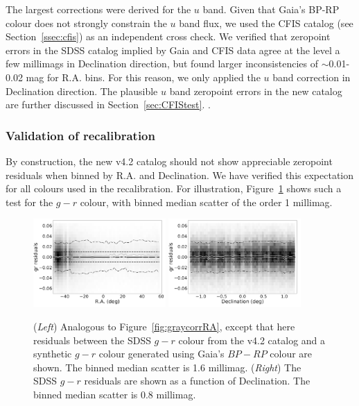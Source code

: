 \documentclass[fleqn,usenatbib]{mnras}
\begin{document}
The largest corrections were derived for the $u$ band. Given that Gaia's BP-RP
colour does not strongly constrain the $u$ band flux, we used the CFIS catalog 
(see Section~\ref{ssec:cfis}) as an independent cross check. We verified that
zeropoint errors in the SDSS catalog implied by Gaia and CFIS data agree at the
level a few millimags in Declination direction, but found larger inconsistencies of $\sim$0.01-0.02 mag
 for R.A. bins. For this reason, we only applied the $u$ band 
correction in Declination direction. The plausible $u$ band zeropoint errors in 
the new catalog are further discussed in Section~\ref{sec:CFIStest}. . 



\subsubsection{Validation of recalibration  \label{sec:SSCvsGaia}} 
  
By construction, the new v4.2 catalog should not show appreciable zeropoint residuals when 
binned by R.A. and Declination. We have verified this expectation for all colours used in 
the recalibration. For illustration, Figure~\ref{fig:grVSgaiaRADec} shows such a test for the $g-r$ 
colour, with binned median scatter of the order 1 millimag. 

\begin{figure}
    \centering\includegraphics[width=0.45\textwidth]{figures/colorResidGaiaColors_gr_RA_Hess_lr.png} 
    \centering\includegraphics[width=0.45\textwidth]{figures/colorResidGaiaColors_gr_Dec_Hess_lr.png} 
\caption{({\it Left}) Analogous to Figure~\ref{fig:graycorrRA}, except that here residuals between
the SDSS $g-r$ colour from the v4.2 catalog and a synthetic $g-r$ colour generated using 
Gaia's $BP-RP$ colour are shown. The binned median scatter is 1.6 millimag. ({\it Right}) The 
SDSS $g-r$ residuals are shown as a function of Declination. The binned median scatter is 
0.8 millimag.}
\label{fig:grVSgaiaRADec}
\end{figure}
 
\end{document}
